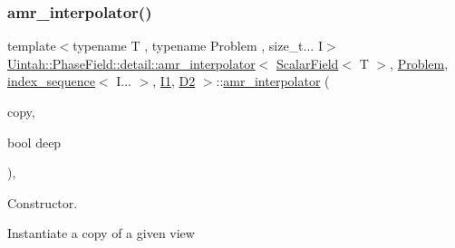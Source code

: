 \subsubsection{\texorpdfstring{amr\+\_\+interpolator()}{amr\_interpolator()}\hspace{0.1cm}{\footnotesize\ttfamily [1/4]}}
{\footnotesize\ttfamily template$<$typename T , typename Problem , size\+\_\+t... I$>$ \\
\hyperlink{classUintah_1_1PhaseField_1_1detail_1_1amr__interpolator}{Uintah\+::\+Phase\+Field\+::detail\+::amr\+\_\+interpolator}$<$ \hyperlink{structUintah_1_1PhaseField_1_1ScalarField}{Scalar\+Field}$<$ T $>$, \hyperlink{classUintah_1_1PhaseField_1_1Problem}{Problem}, \hyperlink{namespaceUintah_1_1PhaseField_a237de804d99512e50613aff7c94a9461}{index\+\_\+sequence}$<$ I... $>$, \hyperlink{namespaceUintah_1_1PhaseField_a547ce3002aa97fbd3ef3192a6eec8406a66f19efe774b0d2b6e5844eb2d83d305}{I1}, \hyperlink{namespaceUintah_1_1PhaseField_a12bfc68444894dffdf0cb8d9cf0cc76aa1a451dae278b0103a94105c8776e9a67}{D2} $>$\+::\hyperlink{classUintah_1_1PhaseField_1_1detail_1_1amr__interpolator}{amr\+\_\+interpolator} (\begin{DoxyParamCaption}\item[{const \hyperlink{classUintah_1_1PhaseField_1_1detail_1_1amr__interpolator}{amr\+\_\+interpolator}$<$ \hyperlink{structUintah_1_1PhaseField_1_1ScalarField}{Scalar\+Field}$<$ T $>$, \hyperlink{classUintah_1_1PhaseField_1_1Problem}{Problem}, \hyperlink{namespaceUintah_1_1PhaseField_a237de804d99512e50613aff7c94a9461}{index\+\_\+sequence}$<$ I... $>$, \hyperlink{namespaceUintah_1_1PhaseField_a547ce3002aa97fbd3ef3192a6eec8406a66f19efe774b0d2b6e5844eb2d83d305}{I1}, \hyperlink{namespaceUintah_1_1PhaseField_a12bfc68444894dffdf0cb8d9cf0cc76aa1a451dae278b0103a94105c8776e9a67}{D2} $>$ $\ast$}]{copy,  }\item[{bool}]{deep }\end{DoxyParamCaption})\hspace{0.3cm}{\ttfamily [inline]}, {\ttfamily [protected]}}



Constructor. 

Instantiate a copy of a given view


